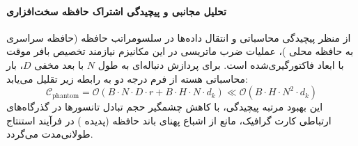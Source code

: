 \paragraph{تحلیل مجانبی و پیچیدگی اشتراک حافظه سخت‌افزاری}
از منظر پیچیدگی محاسباتی و انتقال داده‌ها در سلسومراتب حافظه (حافظه سراسری  به حافظه محلی )، عملیات ضرب ماتریسی در این مکانیزم نیازمند تخصیص بافر موقت با ابعاد فاکتورگیری‌شده است. برای پردازش دنباله‌ای به طول $N$ با بعد مخفی $D$، بار محاسباتی هسته از فرم درجه دو به رابطه زیر تقلیل می‌یابد:
\begin{equation}
\label{eq:complexity_phantom}
\mathcal{C}_{\text{phantom}} = \mathcal{O}\left( B \cdot N \cdot D \cdot r + B \cdot H \cdot N \cdot d_k \right) \ll \mathcal{O}\left( B \cdot H \cdot N^2 \cdot d_k \right)
\end{equation}
این بهبود مرتبه پیچیدگی، با کاهش چشمگیر حجم تبادل تانسورها در گذرگاه‌های ارتباطی کارت گرافیک، مانع از اشباع پهنای باند حافظه (پدیده ) در فرآیند استنتاج طولانی‌مدت می‌گردد.